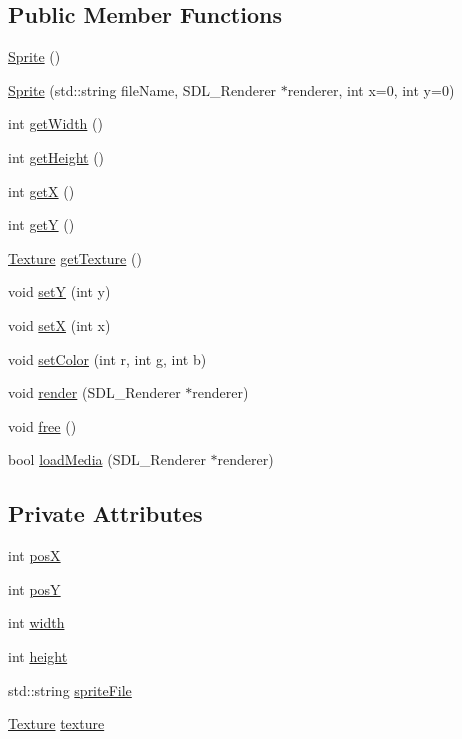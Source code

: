 \subsection*{Public Member Functions}
\begin{DoxyCompactItemize}
\item 
\hyperlink{class_sprite_a12cba3ac1868418add3c4d95ce87e615}{Sprite} ()
\item 
\hyperlink{class_sprite_a9e4b47480afc64a0969d2b9014af02cc}{Sprite} (std\+::string file\+Name, S\+D\+L\+\_\+\+Renderer $\ast$renderer, int x=0, int y=0)
\item 
int \hyperlink{class_sprite_aba3d4752461ec679fbf5de7ec4c34f61}{get\+Width} ()
\item 
int \hyperlink{class_sprite_a67b67082cfda90103d2d9eefea04cc4b}{get\+Height} ()
\item 
int \hyperlink{class_sprite_a03d6c82bddfd3d164ce8997482c57c85}{getX} ()
\item 
int \hyperlink{class_sprite_a53ea8b27bcd0dab0627a2dceab2b9d98}{getY} ()
\item 
\hyperlink{class_texture}{Texture} \hyperlink{class_sprite_a95126cbe568a388a5b1092dee95716d0}{get\+Texture} ()
\item 
void \hyperlink{class_sprite_afe7d6d636fc460358c40a403af259d0e}{setY} (int y)
\item 
void \hyperlink{class_sprite_ae21322c28b8719af996990fafa920762}{setX} (int x)
\item 
void \hyperlink{class_sprite_a1ca0939610f24386a4eecb8e91688c65}{set\+Color} (int r, int g, int b)
\item 
void \hyperlink{class_sprite_a72231a3cc5414b94ab6bfcbddc3b327c}{render} (S\+D\+L\+\_\+\+Renderer $\ast$renderer)
\item 
void \hyperlink{class_sprite_abce3359b4f055bac7384038046ed9ead}{free} ()
\item 
bool \hyperlink{class_sprite_adab722e01e4d3e197f52ecad6ac8d70a}{load\+Media} (S\+D\+L\+\_\+\+Renderer $\ast$renderer)
\end{DoxyCompactItemize}
\subsection*{Private Attributes}
\begin{DoxyCompactItemize}
\item 
int \hyperlink{class_sprite_a0af496e3e6540f1f1321913a741a737a}{posX}
\item 
int \hyperlink{class_sprite_a1ef80a5eff9d5b0bb90ae355daf09efe}{posY}
\item 
int \hyperlink{class_sprite_a0a3364944c5e361fc9e7ae406224d682}{width}
\item 
int \hyperlink{class_sprite_a1f07c8f2080c193759aec0e13503d7ab}{height}
\item 
std\+::string \hyperlink{class_sprite_a595ffe434aadbc94b9abd272c0356c9d}{sprite\+File}
\item 
\hyperlink{class_texture}{Texture} \hyperlink{class_sprite_aa4978b284ebaae7225869d238dcb32cb}{texture}
\end{DoxyCompactItemize}


